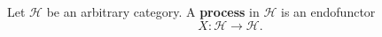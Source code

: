Let $\mathcal{H}$ be an arbitrary category. A \textbf{process} in $\mathcal{H}$ is an endofunctor
$$X: \mathcal{H} \rightarrow \mathcal{H}.$$

